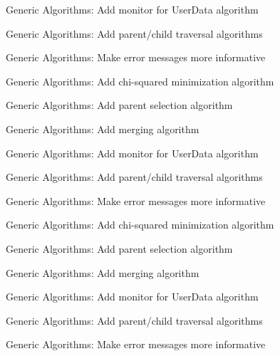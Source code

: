 \begin{DoxyRefList}
Generic Algorithms\+: Add monitor for User\+Data algorithm 

Generic Algorithms\+: Add parent/child traversal algorithms 

Generic Algorithms\+: Make error messages more informative 

Generic Algorithms\+: Add chi-\/squared minimization algorithm 

Generic Algorithms\+: Add parent selection algorithm 

Generic Algorithms\+: Add merging algorithm 

Generic Algorithms\+: Add monitor for User\+Data algorithm 

Generic Algorithms\+: Add parent/child traversal algorithms 

Generic Algorithms\+: Make error messages more informative 

Generic Algorithms\+: Add chi-\/squared minimization algorithm 

Generic Algorithms\+: Add parent selection algorithm 

Generic Algorithms\+: Add merging algorithm 

Generic Algorithms\+: Add monitor for User\+Data algorithm 

Generic Algorithms\+: Add parent/child traversal algorithms 

Generic Algorithms\+: Make error messages more informative 
\end{DoxyRefList}